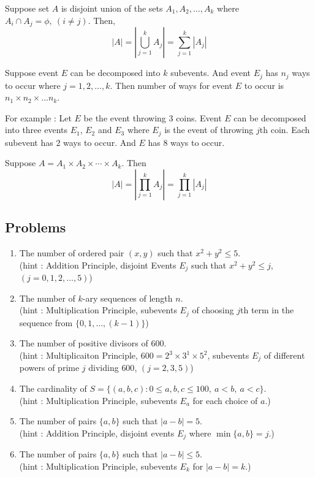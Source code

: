 \begin{remark}
	Suppose set $A$ is disjoint union of the sets $A_1,A_2,\dots,A_k$ where $A_i \cap A_j = \phi,\ (i \ne j)$.
	Then,
	$$ |A| = \left|\bigcup_{j=1}^k A_j \right| = \sum_{j=1}^k |A_j|$$
\end{remark}

\begin{definition}
	Suppose event $E$ can be decomposed into $k$ subevents.
	And event $E_j$ has $n_j$ ways to occur where $j=1,2,\dots,k$.
	Then number of ways for event $E$ to occur is $n_1 \times n_2 \times \dots n_k$.
\end{definition}
For example : Let $E$ be the event throwing 3 coins. Event $E$ can be decomposed into three events $E_1$, $E_2$ and $E_3$ where $E_j$ is the event of throwing $j$th coin. Each subevent has $2$ ways to occur. And $E$ has $8$ ways to occur.

\begin{remark}
	Suppose $A = A_1 \times A_2 \times \dotsm \times A_k$.
	Then 
	$$|A| = \left|\prod_{j=1}^k A_j\right| = \prod_{j=1}^k |A_j|$$
\end{remark}

\subsection*{Problems}
\begin{enumerate}
	\item The number of ordered pair $(x,y)$ such that $x^2+y^2 \le 5$.\\
	(hint : Addition Principle, disjoint Events $E_j$ such that $x^2+y^2 \le j$, $(j=0,1,2,\dots,5)$)
	\cite[Example 1.1.2]{chen}
	\item The number of $k$-ary sequences of length $n$.\\
	(hint : Multiplication Principle, subevents $E_j$ of choosing $j$th term in the sequence from $\{0,1,\dots,(k-1)\}$)
	\cite[Example 1.1.4]{chen}
	\item The number of positive divisors of $600$.\\
	(hint : Multiplicaiton Principle, $600 = 2^3 \times 3^1 \times 5^2$, subevents $E_j$ of different powers of prime $j$ dividing $600$, $(j=2,3,5)$)
	\cite[Example 1.1.5]{chen}
	\item The cardinality of $S = \{ (a,b,c) : 0\le a,b,c \le 100,\ a<b,\ a<c \}$.\\
	(hint : Multiplication Principle, subevents $E_a$ for each choice of $a$.)
	\cite[Example 1.1.6]{chen}
	\item The number of pairs $\{a,b\}$ such that $|a-b| = 5$.\\
	(hint : Addition Principle, disjoint events $E_j$ where $\min\{a,b\} = j$.)
	\cite[Exercise 1.1(i)]{chen} 
	\item The number of pairs $\{a,b\}$ such that $|a-b| \le 5$.\\
	(hint : Multiplication Principle, subevents $E_k$ for $|a-b|=k$.)
	\cite[Exercise 1.1(ii)]{chen} 
\end{enumerate}


